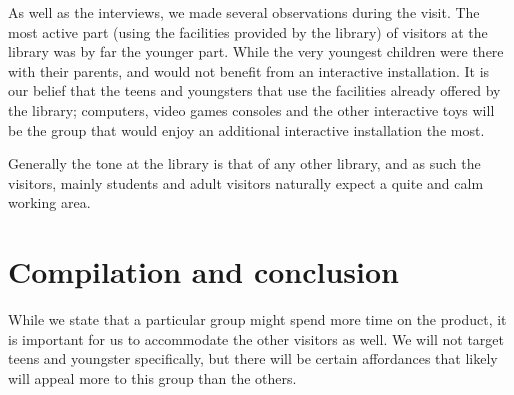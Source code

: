 As well as the interviews, we made several observations during the visit. The most active part (using the facilities provided by the library) of visitors at the library was by far the younger part. While the very youngest children were there with their parents, and would not benefit from an interactive installation. It is our belief that the teens and youngsters that use the facilities already offered by the library; computers, video games consoles and the other interactive toys  will be the group that would enjoy an additional interactive installation the most.

Generally the tone at the library is that of any other library, and as such the visitors, mainly students and adult visitors naturally expect a quite and calm working area.

\section{Compilation and conclusion}

While we state that a particular group might spend more time on the product, it is important for us to accommodate the other visitors as well. We will not target teens and youngster specifically, but there will be certain affordances that likely will appeal more to this group than the others.
\\

